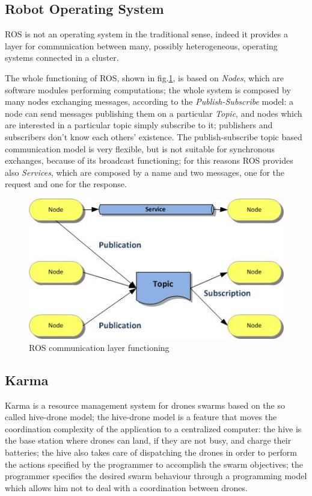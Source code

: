 \subsection{Robot Operating System}\label{ros}

ROS\cite{ros} is not an operating system in the traditional sense, indeed it provides a layer for communication between many, possibly heterogeneous, operating systems connected in a cluster.

The whole functioning of ROS, shown in fig.\ref{fig:ros}, is based on \textit{Nodes}, which are software modules performing computations; the whole system is composed by many nodes exchanging messages, according to the \textit{Publish-Subscribe} model:
a node can send messages publishing them on a particular \textit{Topic}, and nodes which are interested in a particular topic simply subscribe to it; publishers and subscribers don't know each others' existence.
The publish-subscribe topic based communication model is very flexible, but is not suitable for synchronous exchanges, because of its broadcast functioning; for this reasons ROS provides also \textit{Services}, which are composed by a name and two messages, one for the request and one for the response.

\begin{figure}[htbp]
  \centering
  \includegraphics[width=\linewidth]{pictures/ros.jpg}
  \caption{ROS communication layer functioning}
  \label{fig:ros}
\end{figure}


\newpage

\subsection{Karma}\label{karma}

Karma\cite{karma} is a resource management system for drones swarms based on the so called hive-drone model; the hive-drone model is a feature that moves the coordination complexity of the application to a centralized computer: the hive is the base station where drones can land, if they are not busy, and charge their batteries; the hive also takes care of dispatching the drones in order to perform the actions specified by the programmer to accomplish the swarm objectives; the programmer specifies the desired swarm behaviour through a programming model which allows him not to deal with a coordination between drones.

